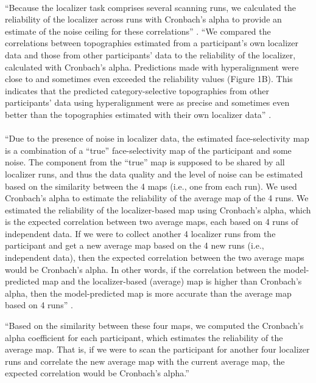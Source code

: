 \paragraph{\citet{jiahui2022cross}}
%
``Because the localizer task comprises several scanning runs, we calculated the
reliability of the localizer across runs with Cronbach's alpha to provide an
estimate of the noise ceiling for these correlations'' \citep{jiahui2022cross}.
%
``We compared the correlations between topographies estimated from a
participant's own localizer data and those from other participants' data to the
reliability of the localizer, calculated with Cronbach's alpha.
%
Predictions made with hyperalignment were close to and sometimes even exceeded
the reliability values (Figure 1B).
%
This indicates that the predicted category-selective topographies from other
participants' data using hyperalignment were as precise and sometimes even
better than the topographies estimated with their own localizer data''
\citep{jiahui2022cross}.


\paragraph{\citet{feilong2022individualized}}
%
``Due to the presence of noise in localizer data, the estimated face-selectivity
map is a combination of a “true” face-selectivity map of the participant and
some noise.
%
The component from the “true” map is supposed to be shared by all localizer
runs, and thus the data quality and the level of noise can be estimated based on
the similarity between the 4 maps (i.e., one from each run).
%
We used Cronbach's alpha to estimate the reliability  of the average map of the
4 runs.
%
We estimated the reliability of the localizer-based map using Cronbach's alpha,
which is the expected correlation between two average maps, each based on 4 runs
of independent data.
%
If we were to collect another 4 localizer runs from the participant and get a
new average map based on the 4 new runs (i.e., independent data), then the
expected correlation between the two average maps would be Cronbach's alpha.
%
In other words, if the correlation between the model-predicted map and the
localizer-based (average) map is higher than Cronbach's alpha, then the
model-predicted map is more accurate than the average map based on 4 runs''
\citep{feilong2022individualized}.

%
``Based on the similarity between these four maps, we computed the Cronbach's
alpha coefficient for each participant, which estimates the reliability of the
average map.
%
That is, if we were to scan the participant for another four localizer runs and
correlate the new average map with the current average map, the expected
correlation would be Cronbach's alpha.'' \citep{feilong2022individualized}


